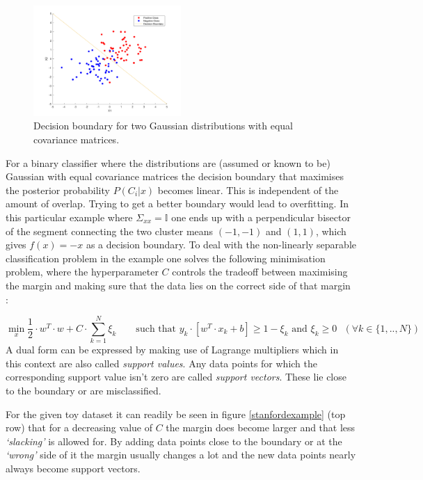 
\begingroup
\setlength{\columnsep}{0.75cm}
\setlength{\intextsep}{1cm}
\begin{figure}
\includegraphics[width=0.5\textwidth]{../src/figures/twogaussians.pdf}
\caption{Decision boundary for two Gaussian distributions with equal covariance matrices.}
\label{twogaussians}
\end{figure}
For a binary classifier where the distributions are (assumed or known to be) Gaussian with equal covariance matrices the decision boundary that maximises the posterior probability $P(C_i|x)$ becomes linear. This is independent of the amount of overlap. Trying to get a better boundary would lead to overfitting. In this particular example where $\Sigma_{xx}=\mathbb{I}$ one ends up with a perpendicular bisector of the segment connecting the two cluster means 
$(-1,-1)$ and $(1,1)$, which gives $f(x)=-x$ as a decision boundary.
To deal with the non-linearly separable classification problem in the example one solves the following minimisation problem, where the hyperparameter $C$ controls the tradeoff between maximising the margin and making sure that the data lies on the correct side of that margin :

\endgroup

$$\min_x\frac{1}{2}\cdot w^T\cdot w+C\cdot \sum_{k=1}^N\xi_k\qquad\text{such that $y_k\cdot[w^T\cdot x_k+b]\geq 1-\xi_k$ and $\xi_k\geq 0$ $(\forall k\in\{1,..,N\})$}$$
A dual form can be expressed by making use of Lagrange multipliers which in this context are also called \textit{support values}. Any data points for which the corresponding support value isn't zero are called \textit{support vectors}. These lie close to the boundary or are misclassified.

\par\noindent For the given toy dataset it can readily be seen in figure \ref{stanfordexample} (top row) that for a decreasing value of $C$ the margin does become larger and that less \textit{`slacking'} is allowed for. By adding data points close to the boundary or at the \textit{`wrong'} side of it the margin usually changes a lot and the new data points nearly always become support vectors.

